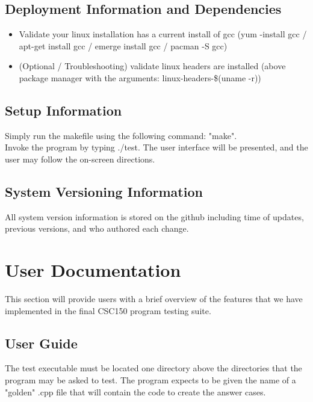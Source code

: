\documentclass {article}
\begin{document}
		\subsection{\Large{\color{blue}Deployment Information and Dependencies}}
			\begin {itemize}
				\item Validate your linux installation has a current install of gcc (yum -install
				 gcc / apt-get install gcc / emerge install gcc  / pacman -S gcc)
				\item (Optional / Troubleshooting) validate linux headers are installed (above
				 package manager with the arguments: linux-headers-\$(uname -r))
			\end {itemize}	
			
		\subsection{\Large{\color{blue}Setup Information}}
			Simply run the makefile using the following command: "make".\\Invoke the program by
			 typing ./test. The user interface will be presented, and the user may follow the
			 on-screen directions.
			 
		\subsection{\Large{\color{blue}System Versioning Information}}
			All system version information is stored on the github including time of updates,
			 previous versions, and who authored each change.
			 
	\newpage
	
	\section{\LARGE{\color{blue}User Documentation}}
		This section will provide users with a brief overview of the features that we have
		 implemented in the final CSC150 program testing suite.	
		 
		\subsection{\Large{\color{blue}User Guide}}
		 	The test executable must be located one directory above the directories that the
		 	 program may be asked to test. The program expects to be given the name of a "golden"
		 	 .cpp file that will contain the code to create the answer cases.
		 	 
\end{document}
